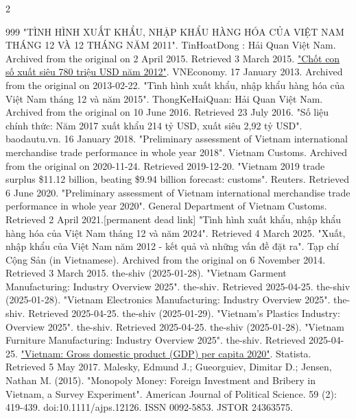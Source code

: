 \documentclass[openany]{book}
\begin{document}
\begin{multicols}{2}
\begin{thebibliography}{999}
 "TÌNH HÌNH XUẤT KHẨU, NHẬP KHẨU HÀNG HÓA CỦA VIỆT NAM THÁNG 12 VÀ 12 THÁNG NĂM 2011". TinHoatDong : Hải Quan Việt Nam. Archived from the original on 2 April 2015. Retrieved 3 March 2015.
 \href{https://web.archive.org/web/20130222093117/http://vneconomy.vn/20130117054115934P0C9920/chot-con-so-xuat-sieu-780-trieu-usd-nam-2012.htm}{"Chốt con số xuất siêu 780 triệu USD năm 2012"}. VNEconomy. 17 January 2013. Archived from the original on 2013-02-22.
 "Tình hình xuất khẩu, nhập khẩu hàng hóa của Việt Nam tháng 12 và năm 2015". ThongKeHaiQuan: Hải Quan Việt Nam. Archived from the original on 10 June 2016. Retrieved 23 July 2016.
 "Số liệu chính thức: Năm 2017 xuất khẩu 214 tỷ USD, xuất siêu 2,92 tỷ USD". baodautu.vn. 16 January 2018.
 "Preliminary assessment of Vietnam international merchandise trade performance in whole year 2018". Vietnam Customs. Archived from the original on 2020-11-24. Retrieved 2019-12-20.
 "Vietnam 2019 trade surplus \$11.12 billion, beating \$9.94 billion forecast: customs". Reuters. Retrieved 6 June 2020.
 "Preliminary assessment of Vietnam international merchandise trade performance in whole year 2020". General Department of Vietnam Customs. Retrieved 2 April 2021.[permanent dead link]
 "Tình hình xuất khẩu, nhập khẩu hàng hóa của Việt Nam tháng 12 và năm 2024". Retrieved 4 March 2025.
 "Xuất, nhập khẩu của Việt Nam năm 2012 - kết quả và những vấn đề đặt ra". Tạp chí Cộng Sản (in Vietnamese). Archived from the original on 6 November 2014. Retrieved 3 March 2015.
 the-shiv (2025-01-28). "Vietnam Garment Manufacturing: Industry Overview 2025". the-shiv. Retrieved 2025-04-25.
 the-shiv (2025-01-28). "Vietnam Electronics Manufacturing: Industry Overview 2025". the-shiv. Retrieved 2025-04-25.
 the-shiv (2025-01-29). "Vietnam's Plastics Industry: Overview 2025". the-shiv. Retrieved 2025-04-25.
 the-shiv (2025-01-28). "Vietnam Furniture Manufacturing: Industry Overview 2025". the-shiv. Retrieved 2025-04-25.
 \href{https://www.statista.com/statistics/444743/gross-domestic-product-gdp-per-capita-in-vietnam/}{"Vietnam: Gross domestic product (GDP) per capita 2020"}. Statista. Retrieved 5 May 2017.
 Malesky, Edmund J.; Gueorguiev, Dimitar D.; Jensen, Nathan M. (2015). "Monopoly Money: Foreign Investment and Bribery in Vietnam, a Survey Experiment". American Journal of Political Science. 59 (2): 419-439. doi:10.1111/ajps.12126. ISSN 0092-5853. JSTOR 24363575.

\end{thebibliography}
\end{multicols}
\end{document}
